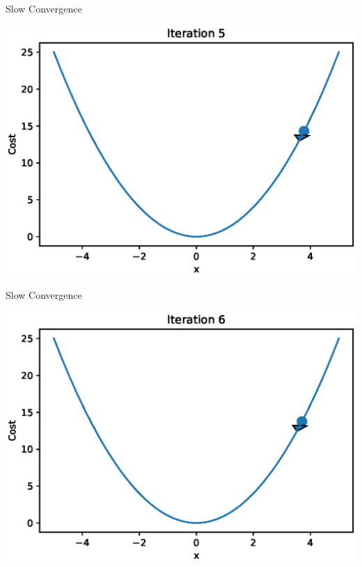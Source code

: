 \documentclass{beamer}
\begin{document}
\begin{frame}{Slow Convergence}
  \begin{center}
       \includegraphics[totalheight=6cm]{gradient-descent/undershooting-5.eps}
   \end{center}
\end{frame}

\begin{frame}{Slow Convergence}
  \begin{center}
       \includegraphics[totalheight=6cm]{gradient-descent/undershooting-6.eps}
   \end{center}
\end{frame}
\end{document}

